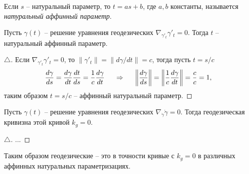 \begin{to_def} 
    Если $s$ -- натуральный параметр, то $t = a s + b$, где $a, b$ константы, называется \textit{натуральный аффинный параметр}. 
\end{to_def}

\begin{to_lem} 
    Пусть $\gamma(t)$ -- решение уравнения геодезических $\nabla_{\gamma'_t} \gamma'_t  = 0.$ Тогда $t$ -- натуральный аффинный параметр.
\end{to_lem}
\begin{proof}[$\triangle$]
    Если $\nabla_{\gamma'_t} \gamma'_t  = 0$, то $\|\gamma'_t\|=
    \|d \gamma / d t\| = c$, тогда пусть $t = s/c$
    \begin{equation*}
        \frac{d \gamma}{d s} = \frac{d \gamma}{d t} \frac{d t}{d s} = \frac{1}{c} \frac{d \gamma}{d t} 
        \hspace{0.5cm} \Rightarrow \hspace{0.5cm} 
        \bigg\|\frac{d \gamma}{d s} \bigg\| = 
        \bigg\| \frac{1}{c} \frac{d \gamma}{d t}  \bigg\| = \frac{c}{c} = 1,
    \end{equation*}
    таким образом $t = s/c$ -- аффинный натуральный параметр.
\end{proof}

\begin{to_lem} 
    Пусть $\gamma(t)$ -- решение уравнения геодезических 
    $\nabla_{\dot{\gamma}} \dot{\gamma} = 0$. Тогда геодезическая кривизна этой кривой $k_g = 0$.
\end{to_lem}

\begin{proof}[$\triangle$]
    ... 
\end{proof}

\noindent
Таким образом геодезические -- это в точности кривые с $k_g = 0$ в различных аффинных натуральных параметризациях.


